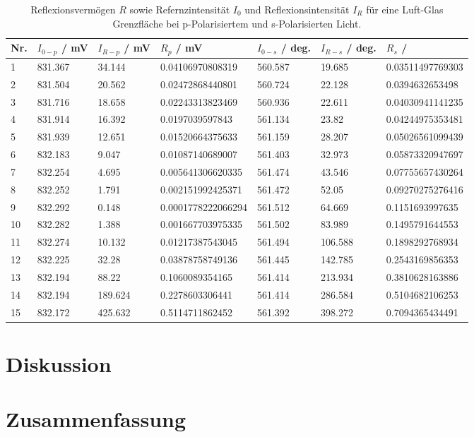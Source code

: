 \documentclass[12pt,a4paper,twoside]{article}
\begin{document}
\begin{table}[H]
    \centering
    \caption{Reflexionsvermögen $R$ sowie Refernzintensität $I_0$ und Reflexionsintensität $I_R$ für eine Luft-Glas Grenzfläche bei p-Polarisiertem und s-Polarisierten Licht.}
    \label{tab:reflexionsvermögen luft glas}
    \begin{tabular}{| l | l | l | l | l | l | l |}
        \hline
        Nr. & $I_{0-p}$ / mV & $I_{R-p}$ / mV & $R_p$ / mV & $I_{0-s}$ / deg. & $I_{R-s}$ / deg. & $R_s$ / \\
        \hline
        1  & 831.367 & 34.144    & 0.04106970808319      & 560.587 & 19.685  & 0.03511497769303  \\
        2  & 831.504 & 20.562    & 0.02472868440801      & 560.724 & 22.128  & 0.0394632653498   \\
        3  & 831.716 & 18.658    & 0.02243313823469      & 560.936 & 22.611  & 0.04030941141235  \\
        4  & 831.914 & 16.392    & 0.0197039597843       & 561.134 & 23.82   & 0.04244975353481  \\
        5  & 831.939 & 12.651    & 0.01520664375633      & 561.159 & 28.207  & 0.05026561099439  \\
        6  & 832.183 & 9.047     & 0.01087140689007      & 561.403 & 32.973  & 0.05873320947697  \\
        7  & 832.254 & 4.695     & 0.005641306620335     & 561.474 & 43.546  & 0.07755657430264  \\
        8  & 832.252 & 1.791     & 0.002151992425371     & 561.472 & 52.05   & 0.09270275276416  \\
        9  & 832.292 & 0.148     & 0.0001778222066294    & 561.512 & 64.669  & 0.1151693997635   \\
        10 & 832.282 & 1.388     & 0.001667703975335     & 561.502 & 83.989  & 0.1495791644553   \\
        11 & 832.274 & 10.132    & 0.01217387543045      & 561.494 & 106.588 & 0.1898292768934   \\
        12 & 832.225 & 32.28     & 0.03878758749136      & 561.445 & 142.785 & 0.2543169856353   \\
        13 & 832.194 & 88.22     & 0.1060089354165       & 561.414 & 213.934 & 0.3810628163886   \\
        14 & 832.194 & 189.624   & 0.2278603306441       & 561.414 & 286.584 & 0.5104682106253   \\
        15 & 832.172 & 425.632   & 0.5114711862452       & 561.392 & 398.272 & 0.7094365434491   \\
        \hline
    \end{tabular}
\end{table}


\section{Diskussion} %


\section{Zusammenfassung} %


\printbibliography[heading=bibintoc]
\end{document}
